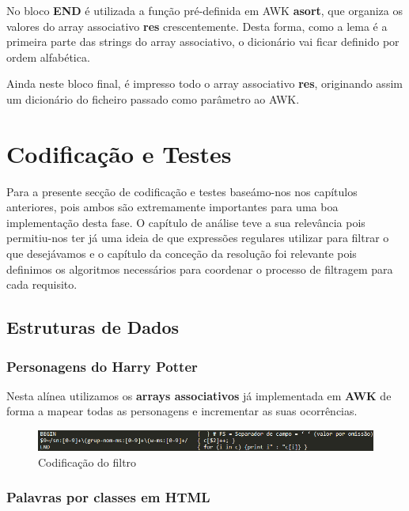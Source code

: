 \documentclass[11pt,a4paper]{report}
\begin{document}
No bloco \textbf{END} é utilizada a função pré-definida em AWK \textbf{asort}, que organiza os valores do array associativo \textbf{res} crescentemente. Desta forma, como a lema é a primeira parte das strings do array associativo, o dicionário vai ficar definido por ordem alfabética.

Ainda neste bloco final, é impresso todo o array associativo \textbf{res}, originando assim um dicionário do ficheiro passado como parâmetro ao AWK.


\chapter{Codificação e Testes}
\label{chap:codificacao}

Para a presente secção de codificação e testes baseámo-nos nos capítulos anteriores, pois ambos são extremamente importantes para uma boa implementação desta fase. O capítulo de análise teve a sua relevância pois permitiu-nos ter já uma ideia de que expressões regulares utilizar para filtrar o que desejávamos e o capítulo da conceção da resolução foi relevante pois definimos os algoritmos necessários para coordenar o processo de filtragem para cada requisito.

\section{Estruturas de Dados}

\subsection{Personagens do Harry Potter}

Nesta alínea utilizamos os  \textbf{arrays associativos} já implementada em \textbf{AWK} de forma a mapear todas as personagens e incrementar as suas ocorrências.

\begin{figure}[H]
\centering
\includegraphics[scale=0.9]{harry.png}
\caption{Codificação do filtro}
\label{img:harry}
\end{figure}



\subsection{Palavras por classes em HTML}
\end{document}
